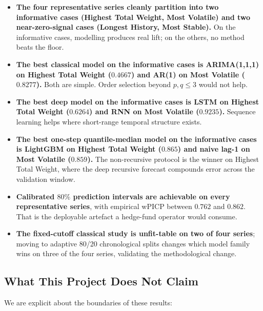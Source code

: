 \begin{itemize}
  \item \textbf{The four representative series cleanly partition into two informative cases (Highest Total Weight, Most Volatile) and two near-zero-signal cases (Longest History, Most Stable).} On the informative cases, modelling produces real lift; on the others, no method beats the floor.
  \item \textbf{The best classical model on the informative cases is ARIMA(1,1,1) on Highest Total Weight ($0.4667$) and AR(1) on Most Volatile ($0.8277$).} Both are simple. Order selection beyond $p,q \le 3$ would not help.
  \item \textbf{The best deep model on the informative cases is LSTM on Highest Total Weight ($0.6264$) and RNN on Most Volatile ($0.9235$).} Sequence learning helps where short-range temporal structure exists.
  \item \textbf{The best one-step quantile-median model on the informative cases is LightGBM on Highest Total Weight ($0.865$) and naive lag-1 on Most Volatile ($0.859$).} The non-recursive protocol is the winner on Highest Total Weight, where the deep recursive forecast compounds error across the validation window.
  \item \textbf{Calibrated $80\%$ prediction intervals are achievable on every representative series}, with empirical wPICP between $0.762$ and $0.862$. That is the deployable artefact a hedge-fund operator would consume.
  \item \textbf{The fixed-cutoff classical study is unfit-table on two of four series}; moving to adaptive 80/20 chronological splits changes which model family wins on three of the four series, validating the methodological change.
\end{itemize}

\subsection{What This Project Does Not Claim}
\label{sec:analysis:limits}

We are explicit about the boundaries of these results:

